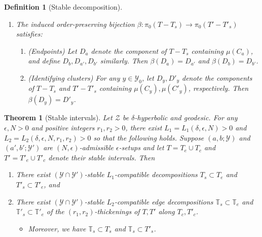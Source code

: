 \documentclass[10pt,a4paper]{amsart}
\newtheorem{definition}{Definition}
\newtheorem{theorem}{Theorem}
\newcommand{\bT}{\mathbb{T}}
\newcommand{\calY}{\mathcal{Y}}
\newcommand{\calZ}{\mathcal{Z}}
\begin{document}
\begin{definition}[Stable decomposition]
\begin{enumerate}
\begin{enumerate}
\item The induced order-preserving bijection $\beta:\pi_0(T-T_s) \to \pi_0(T' - T'_s)$ satisfies: \label{item:adjacency}
\begin{enumerate}
\item (Endpoints) Let $D_a$ denote the component of $T-T_s$ containing $\mu(C_a)$, and define $D_b,D_{a'},D_{b'}$ similarly.  Then $\beta(D_a) = D_{a'}$ and $\beta(D_b) = D_{b'}$. \label{item:endpoint condition}
\item (Identifying clusters) For any $y \in \calY_0$, let $D_y, D'_y$ denote the components of $T-T_s$ and $T' - T'_s$ containing $\mu(C_y), \mu(C'_y)$, respectively.  Then $\beta(D_y) = D'_y$. \label{item:cluster identify}
\end{enumerate}
\end{enumerate}
\end{enumerate}
\end{definition}

\begin{theorem}[Stable intervals]\label{thm:stable intervals}
Let $\calZ$ be $\delta$-hyperbolic and geodesic.  For any $\epsilon, N>0$ and positive integers $r_1,r_2>0$, there exist $L_1 = L_1(\delta, \epsilon, N)>0$ and $L_2 = L_2(\delta, \epsilon, N,r_1,r_2)>0$ so that the following holds.  Suppose $(a,b;\calY)$ and $(a',b';\calY')$ are $(N,\epsilon)$-admissible $\epsilon$-setups and let $T = T_e \cup T_c$ and $T' = T'_e \cup T'_c$ denote their stable intervals.  Then
\begin{enumerate}
\item There exist $(\calY \cap \calY')$-stable $L_1$-compatible decompositions $T_s \subset T_e$ and $T'_s \subset T'_e$, and
\item There exist $(\calY \cap \calY')$-stable $L_2$-compatible edge decompositions $\bT_{s} \subset \bT_{e}$ and $\bT'_{s} \subset \bT'_{e}$ of the $(r_1,r_2)$-thickenings of $T, T'$ along $T_c,T'_c$.
\begin{itemize}
\item Moreover, we have $\bT_s \subset T_s$ and $\bT_s \subset T'_s$.
\end{itemize}
\end{enumerate}

\end{theorem}
\end{document}
